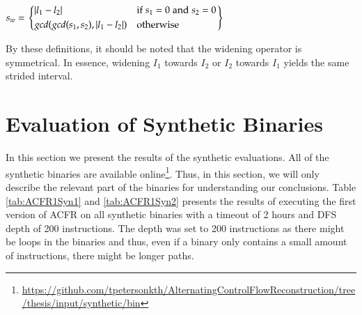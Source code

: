 \documentclass{kththesis}
\begin{document}
\begin{center}
 $s_w = 
\begin{rcases}
    \begin{dcases}
        \lvert l_1-l_2 \rvert & \text{if}\;s_1 = 0\; \text{and} \; s_2 = 0\\
        gcd(gcd(s_1,s_2),\lvert l_1-l_2 \rvert) & \text{otherwise}
    \end{dcases}
\end{rcases}
$
\end{center}
By these definitions, it should be noted that the widening operator is symmetrical. In essence, widening $I_1$ towards $I_2$ or $I_2$ towards $I_1$ yields the same strided interval.

\section{Evaluation of Synthetic Binaries}\label{sec:synEval}
In this section we present the results of the synthetic evaluations. All of the synthetic binaries are available online\footnote{\url{https://github.com/tpetersonkth/AlternatingControlFlowReconstruction/tree/thesis/input/synthetic/bin}}. Thus, in this section, we will only describe the relevant part of the binaries for understanding our conclusions. Table \ref{tab:ACFR1Syn1} and \ref{tab:ACFR1Syn2} presents the results of executing the first version of ACFR on all synthetic binaries with a timeout of 2 hours and DFS depth of 200 instructions. The depth was set to 200 instructions as there might be loops in the binaries and thus, even if a binary only contains a small amount of instructions, there might be longer paths.
\end{document}
